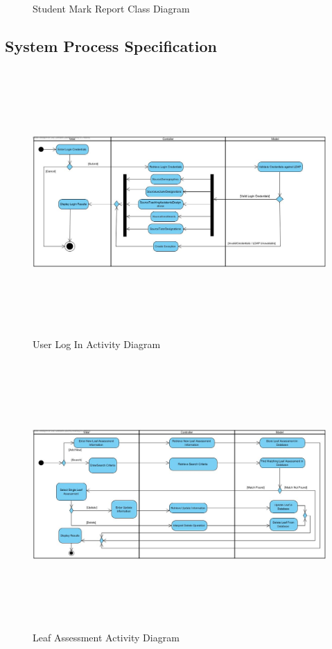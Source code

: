 \documentclass[12pt]{article}
\begin{document}
\begin{itemize}
\begin{figure}[h]
                                                \caption{Student Mark Report Class Diagram}
					\end{figure}
                     \FloatBarrier                   
                                \end{itemize}
						
				\vspace{0.2in}
		
		\subsection{System Process Specification}%
						\begin{figure}[h]
										\centering
										\includegraphics[width=6in, height=4in]{Pictures/LoginActivityDiagram.jpg}
										\caption{User Log In Activity Diagram}
						\end{figure}
						\FloatBarrier
						\begin{figure}[h]
										\centering
										\includegraphics[width=6in, height=4in]{Pictures/LeafAssesmentActivityDiagram.jpg}
										\caption{Leaf Assessment Activity Diagram}
						\end{figure}
\end{document}
